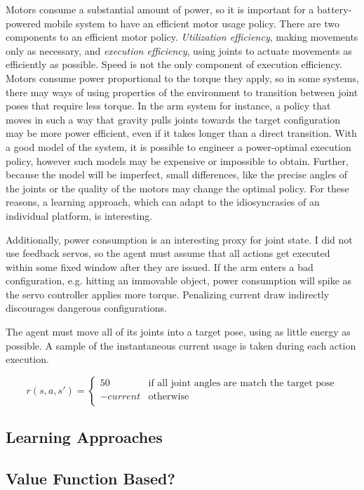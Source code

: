 \documentclass{article}
\begin{document}
Motors consume a substantial amount of power, so it is important for a battery-powered mobile system to have an efficient motor usage policy. There are two components to an efficient motor policy. \textit{Utilization efficiency}, making movements only as necessary, and \textit{execution efficiency}, using joints to actuate movements as efficiently as possible. Speed is not the only component of execution efficiency. Motors consume power proportional to the torque they apply, so in some systems, there may ways of using properties of the environment to transition between joint poses that require less torque. In the arm system for instance, a policy that moves in such a way that gravity pulls joints towards the target configuration may be more power efficient, even if it takes longer than a direct transition. With a good model of the system, it is possible to engineer a power-optimal execution policy, however such models may be expensive or impossible to obtain. Further, because the model will be imperfect, small differences, like the precise angles of the joints or the quality of the motors may change the optimal policy. For these reasons, a learning approach, which can adapt to the idiosyncrasies of an individual platform, is interesting.

Additionally, power consumption is an interesting proxy for joint state. I did not use feedback servos, so the agent must assume that all actions get executed within some fixed window after they are issued. If the arm enters a bad configuration, e.g. hitting an immovable object, power consumption will spike as the servo controller applies more torque. Penalizing current draw indirectly discourages dangerous configurations.

The agent must move all of its joints into a target pose, using as little energy as possible. A sample of the instantaneous current usage is taken during each action execution.

\[ r(s,a,s') =  \left\{
\begin{array}{ll}
	50 & \text{if all joint angles are match the target pose} \\
	-current & \text{otherwise} \\
\end{array} 
\right. \]


\subsection{Learning Approaches}

\subsection{Value Function Based?}
\end{document}
